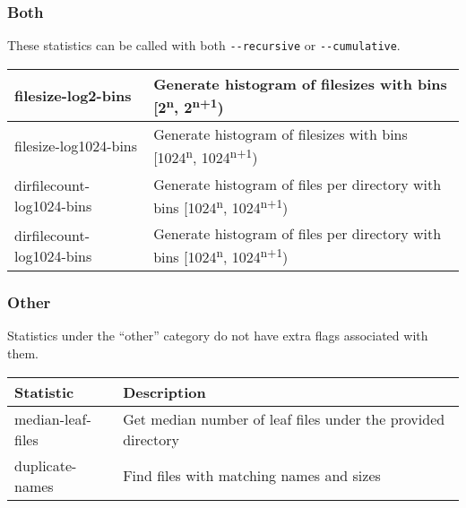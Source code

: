\subsubsection{Both}
These statistics can be called with both \texttt{-{}-recursive} or
\texttt{-{}-cumulative}.
\\
\begin{table}[h!]
  \begin{tabular} {| l | l |}
    \hline
    filesize-log2-bins & Generate histogram of filesizes with bins
    [2\textsuperscript{n}, 2\textsuperscript{n+1}) \\
    \hline
    filesize-log1024-bins & Generate histogram of filesizes with bins
    [1024\textsuperscript{n}, 1024\textsuperscript{n+1}) \\
    \hline
    dirfilecount-log1024-bins & Generate histogram of files per directory with bins
    [1024\textsuperscript{n}, 1024\textsuperscript{n+1}) \\
    \hline
    dirfilecount-log1024-bins & Generate histogram of files per directory with bins
    [1024\textsuperscript{n}, 1024\textsuperscript{n+1}) \\
    \hline
  \end{tabular}
\end{table}

\subsubsection{Other}
Statistics under the ``other'' category do not have extra flags
associated with them.
\\
\begin{table}[h!]
  \begin{tabular} {| l | l |}
    \hline
    Statistic & Description \\
    \hline
    median-leaf-files & Get median number of leaf files under the provided
    directory \\
    \hline
    duplicate-names & Find files with matching names and sizes \\
    \hline
  \end{tabular}
\end{table}
